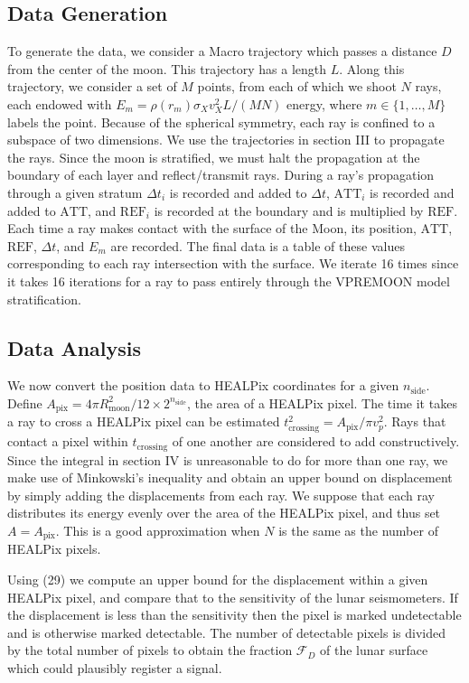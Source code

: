 \documentclass[prd,reprint,10pt,tightenlines]{revtex4-1}
\newcommand*\scr[1]{\mathscr{#1}}
\newcommand*\te[1]{\text{#1}}
\begin{document}
\subsection{Data Generation}
To generate the data, we consider a Macro trajectory which passes a distance $D$ from the center of the moon. This trajectory has a length $L$. Along this trajectory, we consider a set of $M$ points, from each of which we shoot $N$ rays, each endowed with $E_m = \rho(r_{m})\sigma_Xv_X^2 L/(MN)$ energy, where $m\in\{1,\dots,M\}$ labels the point. Because of the spherical symmetry, each ray is confined to a subspace of two dimensions. We use the trajectories in section III to propagate the rays. Since the moon is stratified, we must halt the propagation at the boundary of each layer and reflect/transmit rays. During a ray's propagation through a given stratum $\Delta t_i$ is recorded and added to $\Delta t$, $\te{ATT}_i$ is recorded and added to $\te{ATT}$, and $\te{REF}_i$ is recorded at the boundary and is multiplied by $\te{REF}$. Each time a ray makes contact with the surface of the Moon, its position, $\te{ATT}$, $\te{REF}$, $\Delta t$, and $E_m$ are recorded. The final data is a table of these values corresponding to each ray intersection with the surface. We iterate 16 times since it takes 16 iterations for a ray to pass entirely through the VPREMOON model stratification.
\subsection{Data Analysis}
We now convert the position data to HEALPix coordinates for a given $n_\te{side}$. Define $A_\te{pix} = 4\pi R_\te{moon}^2/12\times 2^{n_{\te{side}}}$, the area of a HEALPix pixel. The time it takes a ray to cross a HEALPix pixel can be estimated $t_\te{crossing}^2 = A_\te{pix}/\pi v_p^2$. Rays that contact a pixel within $t_\te{crossing}$ of one another are considered to add constructively. Since the integral in section IV is unreasonable to do for more than one ray, we make use of Minkowski's inequality and obtain an upper bound on displacement by simply adding the displacements from each ray. We suppose that each ray distributes its energy evenly over the area of the HEALPix pixel, and thus set $A = A_\te{pix}$. This is a good approximation when $N$ is the same as the number of HEALPix pixels. 

Using (29) we compute an upper bound for the displacement within a given HEALPix pixel, and compare that to the sensitivity of the lunar seismometers. If the displacement is less than the sensitivity then the pixel is marked undetectable and is otherwise marked detectable. The number of detectable pixels is divided by the total number of pixels to obtain the fraction $\scr F_D$ of the lunar surface which could plausibly register a signal. 
\end{document}
